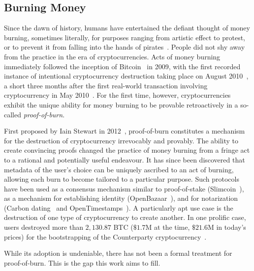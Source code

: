 \subsection{Burning Money}\label{section:introduction}
Since the dawn of history, humans have entertained the defiant thought of money
burning, sometimes literally, for purposes ranging from artistic effect to
protest, or to prevent it from falling into the hands of pirates~\cite{kfoundation,armchair,laertiuslives,ciceroinventione}.
People did not shy away from the practice in the era of cryptocurrencies.
Acts of money burning immediately followed the inception of Bitcoin~\cite{bitcoin} in 2009,
with the first recorded instance of intentional cryptocurrency destruction
taking place on August 2010~\cite{interesting-address}, a short three months after the first real-world
transaction involving cryptocurrency in May 2010~\cite{sok}. For the first time, however,
cryptocurrencies exhibit the unique ability for money burning to be provable
retroactively in a so-called \emph{proof-of-burn}.

First proposed by Iain
Stewart in 2012~\cite{stewart}, proof-of-burn constitutes a mechanism for the
destruction of cryptocurrency irrevocably and provably.
The ability to create convincing proofs changed the practice of money burning
from a fringe act to a rational and potentially useful endeavour. It has since
been discovered that metadata of the user's choice can be uniquely ascribed to
an act of burning, allowing each burn to become tailored to a particular
purpose. Such protocols have been used as a consensus mechanism similar to
proof-of-stake (Slimcoin~\cite{slimcoin}), as a mechanism for establishing
identity (OpenBazaar~\cite{reputation-pledges,zindros}), and for notarization (Carbon
dating~\cite{commitcoin} and
OpenTimestamps~\cite{opentimestamps}). A particularly apt use case is
the destruction of one type of cryptocurrency to create another. In one
prolific case, users destroyed more than $2{,}130.87$ BTC ($\$1.7$M at the
time, $\$21.6$M in today's prices) for the bootstrapping of the
Counterparty cryptocurrency~\cite{counterparty}.

While its adoption is undeniable, there has not been a formal treatment for
proof-of-burn. This is the gap this work aims to fill.

